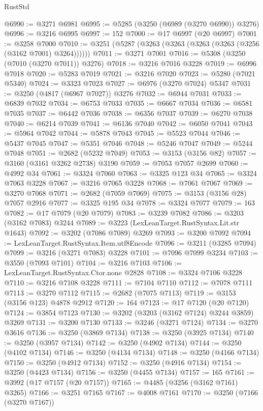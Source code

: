 \begin{lexlean}{RustStd}
\begin{coremodule}
@6990 := @3271 @6981
@6995 := @5285 (@3250 (@6989 (@3270 @6990)) @3276)
@6996 := @3216 @6995
@6997 := 152
@7000 := @17 @6997 (@20 @6997)
@7001 := @3258 @7000
@7010 := @3251 (@5287 (@3263 (@3263 (@3263 (@3263 (@3256 (@3162 @7001) @3264))))))
@7011 := @3271 @7001
@7016 := @5308 (@3250 (@7010 (@3270 @7011)) @3276)
@7018 := @3216 @7016 @3228
@7019 := @6996 @7018
@7020 := @5283 @7019
@7021 := @3216 @7020
@7023 := @5280 (@7021 @5340)
@7024 := @3323 @7023
@7027 := @6976 (@3270 @7024) @5347
@7031 := @3250 (@4817 (@6967 @7027)) @3276
@7032 := @6944 @7031
@7033 := @6839 @7032
@7034 := @6753 @7033
@7035 := @6667 @7034
@7036 := @6581 @7035
@7037 := @6442 @7036
@7038 := @6356 @7037
@7039 := @6270 @7038
@7040 := @6214 @7039
@7041 := @6136 @7040
@7042 := @6050 @7041
@7043 := @5964 @7042
@7044 := @5878 @7043
@7045 := @5523 @7044
@7046 := @5437 @7045
@7047 := @5351 @7046
@7048 := @5246 @7047
@7049 := @5244 @7048
@7051 := @2682 (@5232 @7049)
@7053 := @3153 (@3156 @82)
@7057 := @3160 (@3161 @3262 @2738) @3190
@7059 := @7053 @7057 @2699
@7060 := @4992 @34
@7061 := @3324 @7060
@7063 := @3325 @123 @34
@7065 := @3324 @7063 @3228
@7067 := @3216 @7065 @3228
@7068 := @7061 @7067
@7069 := @3270 @7068
@7071 := @2682 (@7059 @7069)
@7075 := @3153 (@3156 @28) @7057 @2916
@7077 := @3325 @195 @34
@7078 := @3324 @7077
@7079 := 163
@7082 := @17 @7079 (@20 @7079)
@7083 := @3239 @7082
@7086 := @3203 (@3162 @7083) @3244
@7089 := @3223 (LexLeanTarget.RustSyntax.Lit.str @1643)
@7092 := @3202 (@7086 @7089) @3269
@7093 := @3200 @7092
@7094 := LexLeanTarget.RustSyntax.Item.utf8Encode
@7096 := @3211 (@3285 @7094)
@7099 := @3216 (@3271 @7083) @3228
@7101 := @7096 @7099 @3234
@7103 := @3550 (@7093 @7101)
@7104 := @3216 @7103
@7106 := LexLeanTarget.RustSyntax.Ctor.none @2828
@7108 := @3324 @7106 @3228
@7110 := @3216 @7108 @3228
@7111 := @7104 @7110
@7112 := @7078 @7111
@7113 := @3270 @7112
@7115 := @2682 (@7075 @7113)
@7119 := @3153 (@3156 @123) @4878 @2912
@7120 := 164
@7123 := @17 @7120 (@20 @7120)
@7124 := @3854 @7123
@7130 := @3202 (@3203 (@3162 @7124) @3244 @3859) @3269
@7131 := @3200 @7130
@7133 := @3246 (@3271 @7124)
@7134 := @3270 @3616
@7136 := @3250 (@3869 @7134)
@7138 := @3250 (@3925 @7134)
@7140 := @3250 (@3957 @7134)
@7142 := @3250 (@4902 @7134)
@7144 := @3250 (@4102 @7134)
@7146 := @3250 (@4134 @7134)
@7148 := @3250 (@4166 @7134)
@7150 := @3250 (@4912 @7134)
@7152 := @3250 (@4916 @7134)
@7154 := @3250 (@4423 @7134)
@7156 := @3250 (@4455 @7134)
@7157 := 165
@7161 := @3992 (@17 @7157 (@20 @7157))
@7165 := @4485 (@3256 (@3162 @7161) @3265)
@7166 := @3251 @7165
@7167 := @4008 @7161
@7170 := @3250 (@7166 (@3270 @7167))

\end{coremodule}
\end{lexlean}
